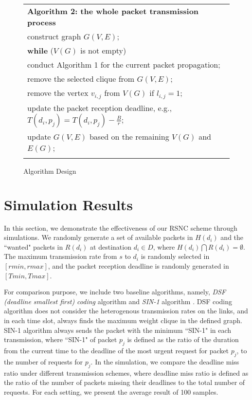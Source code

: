 \documentclass[journal]{IEEEtran}
\begin{document}
\begin{figure}[t]
{\begin{tabular}{|l|}
\hline
\hline {\bf Algorithm 2: the whole packet transmission process}\\
\hspace{2mm} construct graph $G(V,E)$;\\
\hspace{2mm} {\bf while} ($V(G)$ is not empty)\\
\hspace{4mm} conduct Algorithm 1 for the current packet propagation;\\
\hspace{4mm} remove the selected clique from $G(V,E)$;\\
\hspace{4mm} remove the vertex $v_{i,j}$ from $V(G)$ if $l_{i,j}=1$;\\
\hspace{4mm} update the packet reception deadline, e.g., $T(d_i,p_j)=T(d_i,p_j)-\frac{B}{r}$;\\
\hspace{4mm} update $G(V,E)$ based on the remaining $V(G)$ and $E(G)$;\\
\hspace{2mm}{\bf Endwhile}\\
\hline
\end{tabular}\vspace{-0.05in}
\caption{Algorithm Design}\vspace{-0.15in} \label{alg}}
\end{figure}

\vspace{-0.1in}
\section{Simulation Results}\label{Sec.simulation}\vspace{-0.02in}
In this section, we demonstrate the effectiveness of our RSNC scheme through simulations.
We randomly generate a set of available packets in $H(d_i)$ and the ``wanted" packets in $R(d_i)$ at destination $d_i\in D$, where $H(d_i)\bigcap R(d_i)=\emptyset$. The maximum transmission rate from $s$ to $d_i$ is randomly selected in $[rmin,rmax]$, and the packet reception deadline is randomly generated in $[Tmin,Tmax]$.

For comparison purpose, we include two baseline algorithms,
namely, {\em DSF (deadline smallest first) coding} algorithm \cite{ZX2010Broadcast6} and {\em SIN-1} algorithm \cite{XTL2006Time-critical14}. DSF coding algorithm does not consider the heterogenous transmission rates on the links, and in each time slot, always finds the maximum weight clique in the defined graph. SIN-1 algorithm always sends the packet with the minimum ``SIN-1" in each transmission, where ``SIN-1" of packet $p_j$ is defined as the ratio of the duration from the current time to the deadline of the most urgent request for packet $p_j$, to the number of requests for $p_j$. In the simulation, we compare the deadline miss ratio under different transmission schemes, where deadline miss ratio is defined as the ratio of the number of packets missing their deadlines to the total number of requests.
For each setting, we present the average result of 100 samples.
\end{document}
